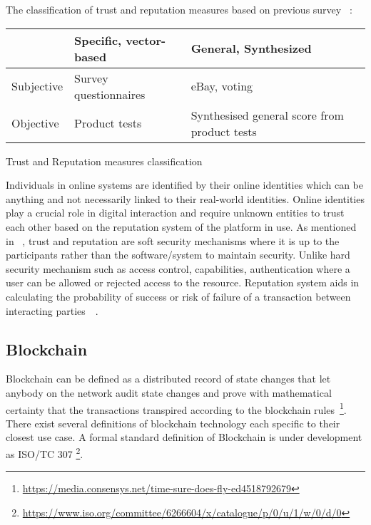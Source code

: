 The classification of trust and reputation measures based on previous survey   
 ~\cite{ josang2007survey}: 
\begin{center}
	\begin{tabularx}{\textwidth }{|X| X| X| }
		\hline
		 & Specific, vector-based & General, Synthesized \\
		 \hline
		Subjective & Survey questionnaires & eBay, voting \\
		\hline
		Objective & Product tests & Synthesised general score from product tests 
		\hline
	\end{tabularx}
	\caption{Trust and Reputation measures classification}
\end{center}
Individuals in online systems are identified by their online identities which
can be anything and not necessarily linked to their real-world identities.
Online identities play a crucial role in digital interaction and require
unknown entities to trust each other based on the reputation system of the
platform in use. As mentioned in ~\cite{rasmusson1996simulated}, trust and
reputation are soft security mechanisms where it is up to the participants
rather than the software/system to maintain security. Unlike hard security
mechanism such as access control, capabilities, authentication where a user can
be allowed or rejected access to the resource. Reputation system aids in
calculating the probability of success or risk of failure of a transaction
between interacting parties~\cite{mui2002notions}~\cite{carbone2003formal}.


\subsection{Blockchain}
Blockchain can be defined as a distributed record of state changes that let
anybody on the network audit state changes and prove with mathematical
certainty that the transactions transpired according to the blockchain
rules~\footnote{\url{https://media.consensys.net/time-sure-does-fly-ed4518792679}}.
There exist several definitions of blockchain technology each specific to their
closest use case. A formal standard definition of Blockchain is under
development as ISO/TC 307
\footnote{\url{https://www.iso.org/committee/6266604/x/catalogue/p/0/u/1/w/0/d/0}}. \\

